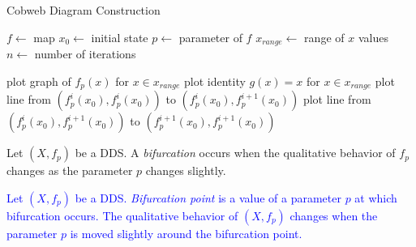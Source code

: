 \begin{algorithm}
\caption{Cobweb Diagram Construction}\label{cobweb_alg}
\begin{algorithmic}[1]
\Statex $f \gets$ map
\Statex $x_0 \gets$ initial state
\Statex $p \gets$ parameter of $f$
\Statex $x_{range} \gets$ range of $x$ values
\Statex $n \gets$ number of iterations

\State plot graph of $f_p(x)$ for $x \in x_{range}$
\State plot identity $g(x)=x$ for $x \in x_{range}$
\State plot line from $(f_{p}^{i}(x_0), f_{p}^{i}(x_0))$ to $(f_{p}^{i}(x_0), f_{p}^{i+1}(x_0))$
\State plot line from $(f_{p}^{i}(x_0), f_{p}^{i+1}(x_0))$ to $(f_{p}^{i+1}(x_0), f_{p}^{i+1}(x_0))$
\EndFor

\end{algorithmic}
\end{algorithm}

\begin{definition}[Bifurcation]
\label{def:bifurcation}
    Let $\left( X, f_p \right)$ be a DDS.
    A \emph{bifurcation} occurs when the qualitative behavior of $f_p$ changes as the parameter $p$ changes slightly.
\end{definition}

\begin{definition}
\label{def:bifurcation_point}
    \textcolor{blue}{
    Let $\left( X, f_p \right)$ be a DDS.
    \emph{Bifurcation point} is a value of a parameter $p$ at which bifurcation occurs.
    The qualitative behavior of $\left( X, f_{p} \right)$ changes when the parameter $p$ is moved slightly around the bifurcation point.
    }
\end{definition}


